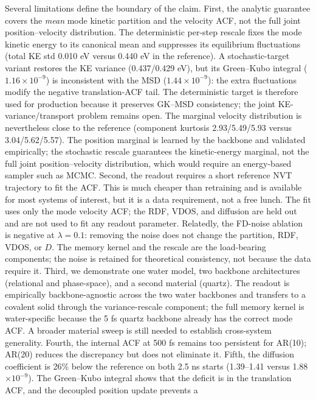 Several limitations define the boundary of the claim. First, the analytic guarantee covers the
\emph{mean} mode kinetic partition and the velocity ACF, not the full joint position--velocity
distribution. The deterministic per-step rescale fixes the mode kinetic energy to its canonical
mean and suppresses its equilibrium fluctuations (total KE std 0.010 eV versus 0.440 eV in the
reference). A stochastic-target variant restores the KE variance (0.437/0.429 eV), but its
Green--Kubo integral (\(1.16\times10^{-9}\)) is inconsistent with the MSD (\(1.44\times10^{-9}\)):
the extra fluctuations modify the negative translation-ACF tail. The deterministic target is
therefore used for production because it preserves GK--MSD consistency; the joint
KE-variance/transport problem remains open. The marginal velocity distribution is nevertheless
close to the reference (component kurtosis 2.93/5.49/5.93 versus 3.04/5.62/5.57). The position
marginal is learned by the backbone and validated empirically; the stochastic rescale guarantees
the kinetic-energy marginal, not the full joint position--velocity distribution, which would
require an energy-based sampler such as MCMC. Second,
the readout requires a short reference NVT trajectory to fit the ACF. This is much cheaper than
retraining and is available for most systems of interest, but it is a data requirement, not a free
lunch. The fit uses only the mode velocity ACF; the RDF, VDOS, and diffusion are held out and are
not used to fit any readout parameter. Relatedly, the FD-noise ablation is negative at
\(\lambda=0.1\): removing the noise does not change the partition, RDF, VDOS, or \(D\). The memory
kernel and the rescale are the load-bearing components; the noise is retained for theoretical
consistency, not because the data require it. Third, we demonstrate one water model, two backbone
architectures (relational and phase-space), and a second material (quartz). The readout is
empirically backbone-agnostic across the two water backbones and transfers to a covalent solid
through the variance-rescale component; the full memory kernel is water-specific because the 5 fs
quartz backbone already has the correct mode ACF. A broader material sweep is still needed to
establish cross-system generality. Fourth, the internal ACF at 500 fs remains too persistent for AR(10); AR(20) reduces
the discrepancy but does not eliminate it. Fifth, the diffusion coefficient is 26\% below the
reference on both 2.5 ns starts (1.39--1.41 versus 1.88\(\times10^{-9}\)). The Green--Kubo integral
shows that the deficit is in the translation ACF, and the decoupled position update prevents a

